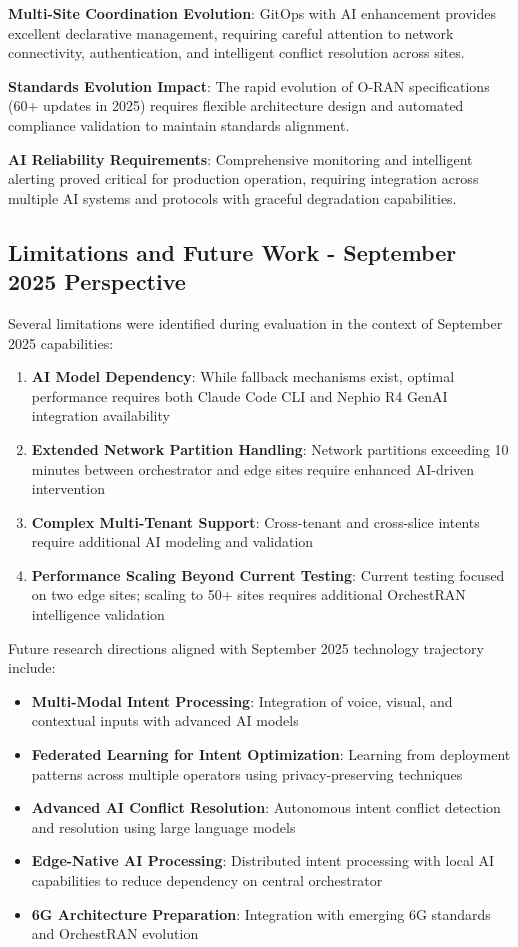 \textbf{Multi-Site Coordination Evolution}: GitOps with AI enhancement provides excellent declarative management, requiring careful attention to network connectivity, authentication, and intelligent conflict resolution across sites.

\textbf{Standards Evolution Impact}: The rapid evolution of O-RAN specifications (60+ updates in 2025) requires flexible architecture design and automated compliance validation to maintain standards alignment.

\textbf{AI Reliability Requirements}: Comprehensive monitoring and intelligent alerting proved critical for production operation, requiring integration across multiple AI systems and protocols with graceful degradation capabilities.

\subsection{Limitations and Future Work - September 2025 Perspective}

Several limitations were identified during evaluation in the context of September 2025 capabilities:

\begin{enumerate}
\item \textbf{AI Model Dependency}: While fallback mechanisms exist, optimal performance requires both Claude Code CLI and Nephio R4 GenAI integration availability
\item \textbf{Extended Network Partition Handling}: Network partitions exceeding 10 minutes between orchestrator and edge sites require enhanced AI-driven intervention
\item \textbf{Complex Multi-Tenant Support}: Cross-tenant and cross-slice intents require additional AI modeling and validation
\item \textbf{Performance Scaling Beyond Current Testing}: Current testing focused on two edge sites; scaling to 50+ sites requires additional OrchestRAN intelligence validation
\end{enumerate}

Future research directions aligned with September 2025 technology trajectory include:
\begin{itemize}
\item \textbf{Multi-Modal Intent Processing}: Integration of voice, visual, and contextual inputs with advanced AI models
\item \textbf{Federated Learning for Intent Optimization}: Learning from deployment patterns across multiple operators using privacy-preserving techniques
\item \textbf{Advanced AI Conflict Resolution}: Autonomous intent conflict detection and resolution using large language models
\item \textbf{Edge-Native AI Processing}: Distributed intent processing with local AI capabilities to reduce dependency on central orchestrator
\item \textbf{6G Architecture Preparation}: Integration with emerging 6G standards and OrchestRAN evolution
\end{itemize}